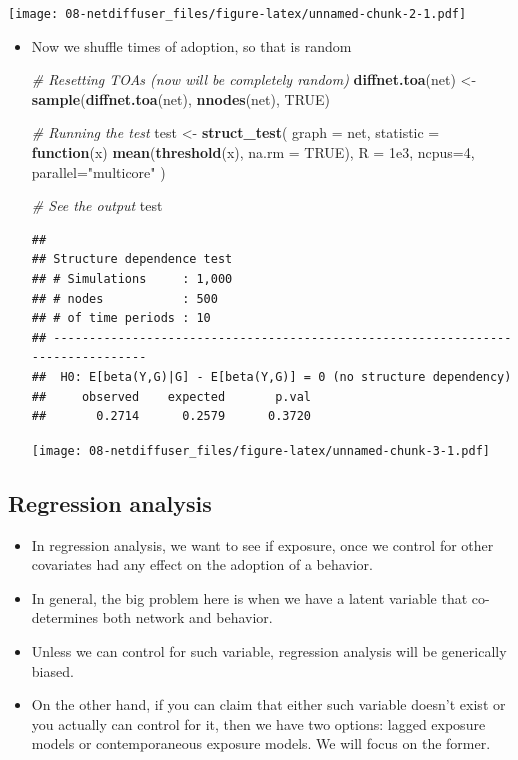 \documentclass[]{book}
\newenvironment{Shaded}{\begin{snugshade}}{\end{snugshade}}
\newcommand{\CommentTok}[1]{\textcolor[rgb]{0.56,0.35,0.01}{\textit{#1}}}
\newcommand{\ControlFlowTok}[1]{\textcolor[rgb]{0.13,0.29,0.53}{\textbf{#1}}}
\newcommand{\DataTypeTok}[1]{\textcolor[rgb]{0.13,0.29,0.53}{#1}}
\newcommand{\DecValTok}[1]{\textcolor[rgb]{0.00,0.00,0.81}{#1}}
\newcommand{\FloatTok}[1]{\textcolor[rgb]{0.00,0.00,0.81}{#1}}
\newcommand{\KeywordTok}[1]{\textcolor[rgb]{0.13,0.29,0.53}{\textbf{#1}}}
\newcommand{\NormalTok}[1]{#1}
\newcommand{\OtherTok}[1]{\textcolor[rgb]{0.56,0.35,0.01}{#1}}
\newcommand{\StringTok}[1]{\textcolor[rgb]{0.31,0.60,0.02}{#1}}
\begin{document}
\texttt{[image: 08-netdiffuser\_files/figure-latex/unnamed-chunk-2-1.pdf]}

\begin{itemize}
\item
  Now we shuffle times of adoption, so that is random

\begin{Shaded}
\begin{Highlighting}[]
\CommentTok{# Resetting TOAs (now will be completely random)}
\KeywordTok{diffnet.toa}\NormalTok{(net) <-}\StringTok{ }\KeywordTok{sample}\NormalTok{(}\KeywordTok{diffnet.toa}\NormalTok{(net), }\KeywordTok{nnodes}\NormalTok{(net), }\OtherTok{TRUE}\NormalTok{)}

\CommentTok{# Running the test}
\NormalTok{test <-}\StringTok{ }\KeywordTok{struct_test}\NormalTok{(}
  \DataTypeTok{graph     =}\NormalTok{ net, }
  \DataTypeTok{statistic =} \ControlFlowTok{function}\NormalTok{(x) }\KeywordTok{mean}\NormalTok{(}\KeywordTok{threshold}\NormalTok{(x), }\DataTypeTok{na.rm =} \OtherTok{TRUE}\NormalTok{),}
  \DataTypeTok{R         =} \FloatTok{1e3}\NormalTok{,}
  \DataTypeTok{ncpus=}\DecValTok{4}\NormalTok{, }\DataTypeTok{parallel=}\StringTok{"multicore"}
\NormalTok{  )}

\CommentTok{# See the output}
\NormalTok{test}
\end{Highlighting}
\end{Shaded}

\begin{verbatim}
## 
## Structure dependence test
## # Simulations     : 1,000
## # nodes           : 500
## # of time periods : 10
## --------------------------------------------------------------------------------
##  H0: E[beta(Y,G)|G] - E[beta(Y,G)] = 0 (no structure dependency)
##     observed    expected       p.val
##       0.2714      0.2579      0.3720
\end{verbatim}

  \texttt{[image: 08-netdiffuser\_files/figure-latex/unnamed-chunk-3-1.pdf]}
\end{itemize}

\hypertarget{regression-analysis}{%
\subsection{Regression analysis}\label{regression-analysis}}

\begin{itemize}
\item
  In regression analysis, we want to see if exposure, once we control for other
  covariates had any effect on the adoption of a behavior.
\item
  In general, the big problem here is when we have a latent variable that
  co-determines both network and behavior.
\item
  Unless we can control for such variable, regression analysis will be
  generically biased.
\item
  On the other hand, if you can claim that either such variable doesn't exist
  or you actually can control for it, then we have two options: lagged exposure
  models or contemporaneous exposure models. We will focus on the former.
\end{itemize}
\end{document}
